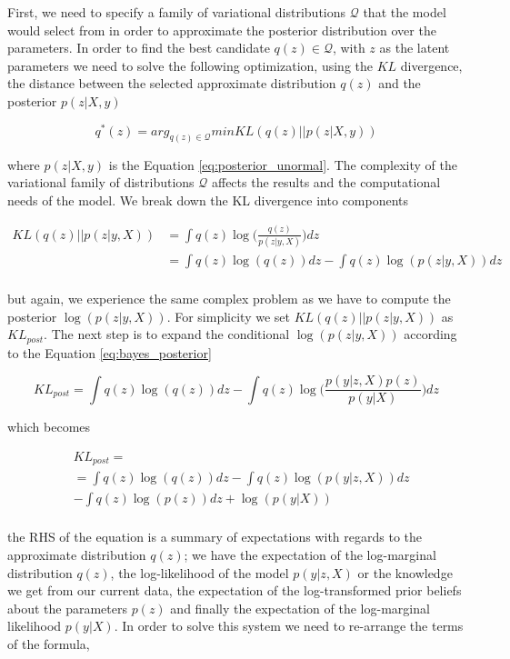 \documentclass[12pt]{article}
\begin{document}
First, we need to specify a family of variational distributions $\mathcal{Q}$ that the model would select from in order to approximate the posterior distribution over the parameters. In order to find the best candidate $q(z) \in \mathcal{Q}$, with $z$ as the latent parameters we need to solve the following optimization, using the $KL$ divergence, the distance between the selected approximate distribution $q(z)$ and the posterior $p(z|X, y)$

\begin{equation}
q^{*}(z) = arg_{q(z) \in \mathcal{Q}}minKL(q(z)||p(z|X, y))
\label{eq:objective_function_vi}
\end{equation}

where $p(z|X, y)$ is the Equation \ref{eq:posterior_unormal}. The complexity of the variational family of distributions $\mathcal{Q}$ affects the results and the computational needs of the model. We break down the KL divergence into components

\begin{align}
KL(q(z)||p(z|y, X)) & = \int q(z) \log\bigg(\frac{q(z)}{p(z|y, X)}\bigg) dz \\ \nonumber
& = \int q(z) \log(q(z)) dz - \int q(z) \log(p(z|y, X)) dz \\ \nonumber
\end{align}

but again, we experience the same complex problem as we have to compute the posterior $\log(p(z|y, X))$. For simplicity we set $KL(q(z)||p(z|y, X))$ as $KL_{post}$. The next step is to expand the conditional $\log(p(z|y, X))$ according to the Equation \ref{eq:bayes_posterior}

\begin{equation}
KL_{post} = \int q(z) \log(q(z)) dz - \int q(z) \log\bigg(\frac{p(y|z, X)p(z)}{p(y|X)}\bigg)dz 
\end{equation}

which becomes

\begin{align}
& KL_{post} = \\ \nonumber
&= \int q(z) \log(q(z)) dz - \int q(z) \log(p(y|z, X))dz \\ \nonumber
&  - \int q(z) \log(p(z))dz + \log(p(y|X)) \\ \nonumber
\end{align}

the RHS of the equation is a summary of expectations with regards to the approximate distribution $q(z)$; we have the expectation of the log-marginal distribution $q(z)$, the log-likelihood of the model $p(y|z, X)$ or the knowledge we get from our current data, the expectation of the log-transformed prior beliefs about the parameters $p(z)$ and finally the expectation of the log-marginal likelihood $p(y|X)$. In order to solve this system we need to re-arrange the terms of the formula,
\end{document}
